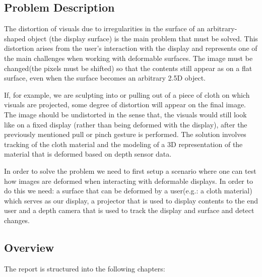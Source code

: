 \documentclass[]{article}
\begin{document}
\subsection{Problem Description}

The distortion of visuals due to irregularities in the surface of an arbitrary-shaped object (the display surface) is the main problem that must be solved. This distortion arises from the user's interaction with the display and represents one of the main challenges when working with deformable surfaces. The image must be changed(the pixels must be shifted) so that the contents still appear as on a flat surface, even when the surface becomes an arbitrary 2.5D object.

If, for example, we are sculpting into or pulling out of a piece of cloth on which visuals are projected, some degree of distortion will appear on the final image. 
The image should be undistorted in the sense that, the visuals would still look like on a fixed display (rather than being deformed with the display), after the previously mentioned pull or pinch gesture is performed. The solution involves tracking of the cloth material and the modeling of a 3D representation of the material that is deformed based on depth sensor data.

In order to solve the problem we need to first setup a scenario where one can test how images are deformed when interacting with deformable displays. In order to do this we need: a surface that can be deformed by a user(e.g.: a cloth material) which serves as our display, a projector that is used to display contents to the end user and a depth camera that is used to track the display and surface and detect changes.

\subsection{Overview}

The report is structured into the following chapters:
\end{document}
